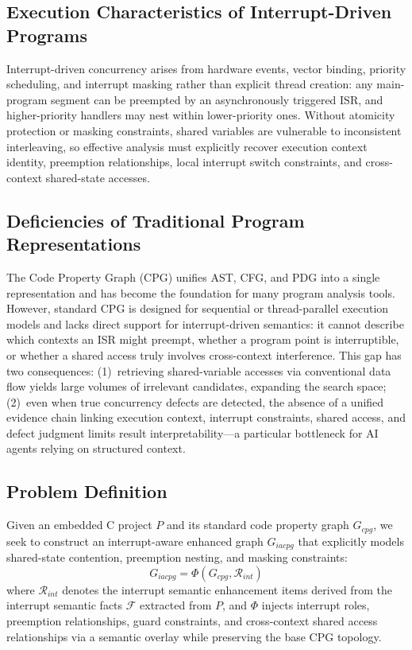 \documentclass[a4paper,UKenglish,cleveref, autoref, thm-restate]{lipics-v2021}
\begin{document}
\subsection{Execution Characteristics of Interrupt-Driven Programs}

Interrupt-driven concurrency arises from hardware events, vector binding, priority scheduling, and interrupt masking rather than explicit thread creation: any main-program segment can be preempted by an asynchronously triggered ISR, and higher-priority handlers may nest within lower-priority ones. Without atomicity protection or masking constraints, shared variables are vulnerable to inconsistent interleaving, so effective analysis must explicitly recover execution context identity, preemption relationships, local interrupt switch constraints, and cross-context shared-state accesses.

\subsection{Deficiencies of Traditional Program Representations}

The Code Property Graph (CPG) unifies AST, CFG, and PDG into a single representation and has become the foundation for many program analysis tools. However, standard CPG is designed for sequential or thread-parallel execution models and lacks direct support for interrupt-driven semantics: it cannot describe which contexts an ISR might preempt, whether a program point is interruptible, or whether a shared access truly involves cross-context interference. This gap has two consequences: (1)~retrieving shared-variable accesses via conventional data flow yields large volumes of irrelevant candidates, expanding the search space; (2)~even when true concurrency defects are detected, the absence of a unified evidence chain linking execution context, interrupt constraints, shared access, and defect judgment limits result interpretability---a particular bottleneck for AI agents relying on structured context.

\subsection{Problem Definition}

Given an embedded C project $P$ and its standard code property graph $G_{cpg}$, we seek to construct an interrupt-aware enhanced graph $G_{iacpg}$ that explicitly models shared-state contention, preemption nesting, and masking constraints:
\begin{equation}
G_{iacpg} = \Phi(G_{cpg}, \mathcal{R}_{int})
\end{equation}
where $\mathcal{R}_{int}$ denotes the interrupt semantic enhancement items derived from the interrupt semantic facts $\mathcal{F}$ extracted from $P$, and $\Phi$ injects interrupt roles, preemption relationships, guard constraints, and cross-context shared access relationships via a semantic overlay while preserving the base CPG topology.
\end{document}
